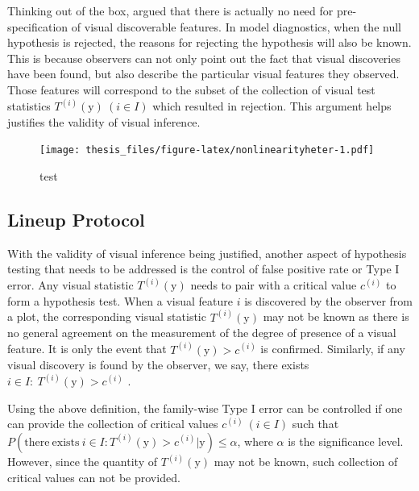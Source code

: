 \documentclass{monashthesis}
\begin{document}
Thinking out of the box, \textcite{buja_statistical_2009} argued that there is actually no need for pre-specification of visual discoverable features. In model diagnostics, when the null hypothesis is rejected, the reasons for rejecting the hypothesis will also be known. This is because observers can not only point out the fact that visual discoveries have been found, but also describe the particular visual features they observed. Those features will correspond to the subset of the collection of visual test statistics \(T^{(i)}(\boldsymbol{\mathrm{y}})~(i \in I)\) which resulted in rejection. This argument helps justifies the validity of visual inference.

\begin{figure}
\centering
\texttt{[image: thesis\_files/figure-latex/nonlinearityheter-1.pdf]}
\caption{\label{fig:nonlinearityheter}test}
\end{figure}

\hypertarget{lineup-protocol}{%
\subsection{Lineup Protocol}\label{lineup-protocol}}

With the validity of visual inference being justified, another aspect of hypothesis testing that needs to be addressed is the control of false positive rate or Type I error. Any visual statistic \(T^{(i)}(\boldsymbol{\mathrm{y}})\) needs to pair with a critical value \(c^{(i)}\) to form a hypothesis test. When a visual feature \(i\) is discovered by the observer from a plot, the corresponding visual statistic \(T^{(i)}(\boldsymbol{\mathrm{y}})\) may not be known as there is no general agreement on the measurement of the degree of presence of a visual feature. It is only the event that \(T^{(i)}(\boldsymbol{\mathrm{y}}) > c^{(i)}\) is confirmed. Similarly, if any visual discovery is found by the observer, we say, there exists \(i \in I:~T^{(i)}(\boldsymbol{\mathrm{y}}) > c^{(i)}\) \autocite{buja_statistical_2009}.

Using the above definition, the family-wise Type I error can be controlled if one can provide the collection of critical values \(c^{(i)}~(i \in I)\) such that \(P(\mathrm{there~exists~} i \in I: T^{(i)}(\boldsymbol{\mathrm{y}}) > c^{(i)}|\boldsymbol{\mathrm{y}}) \leq \alpha\), where \(\alpha\) is the significance level. However, since the quantity of \(T^{(i)}(\boldsymbol{\mathrm{y}})\) may not be known, such collection of critical values can not be provided.
\end{document}
